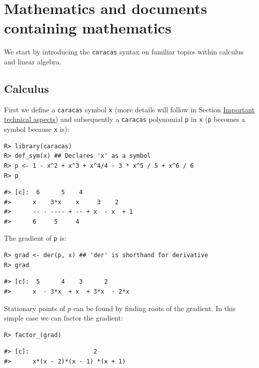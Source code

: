 \hypertarget{mathematics-and-documents-containing-mathematics}{%
\section{Mathematics and documents containing mathematics}\label{mathematics-and-documents-containing-mathematics}}

We start by introducing the \texttt{caracas} syntax on familiar topics within calculus
and linear algebra.

\hypertarget{calculus}{%
\subsection{Calculus}\label{calculus}}

First we define a \texttt{caracas} symbol \texttt{x} (more details will follow
in Section \protect\hyperlink{important-technical-aspects}{Important technical aspects}) and
subsequently a \texttt{caracas} polynomial \texttt{p} in \texttt{x} (\texttt{p} becomes a symbol because \texttt{x} is):

\begin{verbatim}
R> library(caracas)
R> def_sym(x) ## Declares 'x' as a symbol
R> p <- 1 - x^2 + x^3 + x^4/4 - 3 * x^5 / 5 + x^6 / 6
R> p
\end{verbatim}

\begin{verbatim}
#> [c]:  6      5    4              
#>      x    3*x    x     3    2    
#>      -- - ---- + -- + x  - x  + 1
#>      6     5     4
\end{verbatim}

The gradient of \texttt{p} is:

\begin{verbatim}
R> grad <- der(p, x) ## 'der' is shorthand for derivative
R> grad
\end{verbatim}

\begin{verbatim}
#> [c]:  5      4    3      2      
#>      x  - 3*x  + x  + 3*x  - 2*x
\end{verbatim}

Stationary points of \(p\) can be found by finding roots of the gradient. In this simple case we can factor the gradient:

\begin{verbatim}
R> factor_(grad)
\end{verbatim}

\begin{verbatim}
#> [c]:                  2        
#>      x*(x - 2)*(x - 1) *(x + 1)
\end{verbatim}

